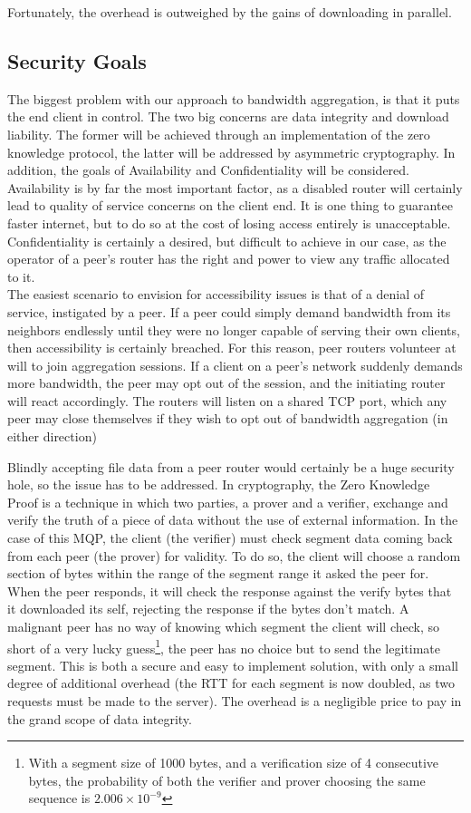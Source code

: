 \documentclass[12pt]{article}
\begin{document}
			Fortunately, the overhead is outweighed by the gains of downloading in parallel.

	\subsection{Security Goals}

		The biggest problem with our approach to bandwidth aggregation, is that it puts the end client in control. The two big concerns are data integrity and download liability. The former will be achieved through an implementation of the zero knowledge protocol, the latter will be addressed by asymmetric cryptography. In addition, the goals of Availability and Confidentiality will be considered. Availability is by far the most important factor, as a disabled router will certainly lead to quality of service concerns on the client end. It is one thing to guarantee faster internet, but to do so at the cost of losing access entirely is unacceptable. Confidentiality is certainly a desired, but difficult to achieve in our case, as the operator of a peer's router has the right and power to view any traffic allocated to it.\\

		The easiest scenario to envision for accessibility issues is that of a denial of service, instigated by a peer. If a peer could simply demand bandwidth from its neighbors endlessly until they were no longer capable of serving their own clients, then accessibility is certainly breached. For this reason, peer routers volunteer at will to join aggregation sessions. If a client on a peer's network suddenly demands more bandwidth, the peer may opt out of the session, and the initiating router will react accordingly. The routers will listen on a shared TCP port, which any peer may close themselves if they wish to opt out of bandwidth aggregation (in either direction)

		Blindly accepting file data from a peer router would certainly be a huge security hole, so the issue has to be addressed. In cryptography, the Zero Knowledge Proof is a technique in which two parties, a prover and a verifier, exchange and verify the truth of a piece of data without the use of external information. In the case of this MQP, the client (the verifier) must check segment data coming back from each peer (the prover) for validity. To do so, the client will choose a random section of bytes within the range of the segment range it asked the peer for. When the peer responds, it will check the response against the verify bytes that it downloaded its self, rejecting the response if the bytes don't match. A malignant peer has no way of knowing which segment the client will check, so short of a very lucky guess\footnote{With a segment size of 1000 bytes, and a verification size of 4 consecutive bytes, the probability of both the verifier and prover choosing the same sequence is $2.006\times10^{-9}$}, the peer has no choice but to send the legitimate segment. This is both a secure and easy to implement solution, with only a small degree of additional overhead (the RTT for each segment is now doubled, as two requests must be made to the server). The overhead is a negligible price to pay in the grand scope of data integrity. 
\end{document}
